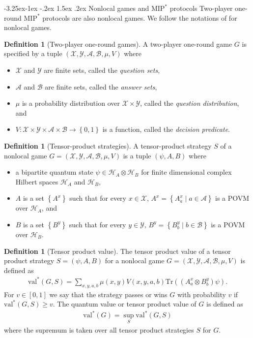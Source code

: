 \documentclass[10pt,a4paper]{article}
\makeatletter
\renewcommand{\subsection}{\@startsection{subsection}{2}{\z@}%
             {-3.25ex\@plus -1ex \@minus -.2ex}%
             {1.5ex \@plus .2ex}%
             {\normalfont\large\scshape\bfseries}}
\theoremstyle{plain}
\theoremstyle{definition}
\newtheorem{definition}[theorem]{Definition}
\newcommand {\set} [1] {\ensuremath{ \left\lbrace #1 \right\rbrace }}
\newcommand {\br} [1] {\ensuremath{ \left( #1 \right) }}
\newcommand {\Tr} {\ensuremath{ \mathrm{Tr} }}
\newcommand{\x}{\otimes}
\newcommand{\calH}{\mathcal{H}}
\newcommand{\calX}{\mathcal{X}}
\newcommand{\calY}{\mathcal{Y}}
\newcommand{\calA}{\mathcal{A}}
\newcommand{\calB}{\mathcal{B}}
\newcommand{\1}{\mathbb{1}} %
\newcommand{\MIP}{\mathrm{MIP}}
\newcommand{\val}{\mathrm{val}}
\makeatother
\begin{document}
\subsection{Nonlocal games and \texorpdfstring{$\MIP^\ast$}{MIP*} protocols} 
Two-player one-round $\MIP^\ast$ protocols are also nonlocal games.
We follow the notations of \cite{JNVWY'20} for nonlocal games.
\begin{definition}[Two-player one-round games]
    A two-player one-round game $G$ is specified by a tuple $(\calX, \calY, \calA, \calB, \mu, V)$ where
    \begin{itemize}
        \item $\calX$ and $\calY$ are finite sets, called the \emph{question sets},
        \item $\calA$ and $\calB$ are finite sets, called the \emph{answer sets},
        \item $\mu$ is a probability distribution over $\calX \times \calY$, called the \emph{question distribution}, and
        \item $V: \calX \times \calY \times \calA \times \calB \to \set{0,1}$ is a function, called the \emph{decision predicate}.
    \end{itemize}
\end{definition}
\begin{definition}[Tensor-product strategies]
    A tensor-product strategy $S$ of a nonlocal game $G = (\calX, \calY, \calA, \calB, \mu, V)$ is a tuple 
    $(\psi, A, B)$ where
    \begin{itemize}
        \item a bipartite quantum state $\psi \in \calH_A \x \calH_B$ for finite dimensional complex Hilbert
spaces $\calH_A$ and $\calH_B$,
        \item $A$ is a set $\set{A^x}$ such that for every $x \in \calX$, $A^x = \set{A^x_a \mid a \in \calA}$ is 
        a POVM over $\calH_A$, and 
        \item $B$ is a set $\set{B^y}$ such that for every $y \in \calY$, $B^y = \set{B^y_b \mid b \in \calB}$ is 
        a POVM over $\calH_B$.
    \end{itemize}
\end{definition}
\begin{definition}[Tensor product value]
    The tensor product value of a tensor product strategy $S = (\psi, A ,B)$ for a nonlocal game
    $G = (\calX, \calY, \calA, \calB, \mu, V)$ is defined as
    \begin{align*}
        \val^\ast(G,S) = \sum_{x,y,a,b} \mu(x,y)V(x,y,a,b) \Tr\br{\br{A^x_a \x B^y_b}\psi}.
    \end{align*}
    For $v \in [0,1]$ we say that the strategy passes or wins $G$ with probability $v$ if $\val^\ast(G,S)\geq v$.
    The quantum value or tensor product value of $G$ is defined as
    \begin{align*}
        \val^*(G) = \sup_{S} \val^\ast(G,S)
    \end{align*}
    where the supremum is taken over all tensor product strategies $S$ for $G$.
\end{definition}
\end{document}
